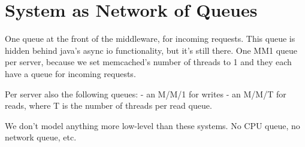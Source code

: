 \documentclass[11pt]{article}
\begin{document}
\section{System as Network of Queues}\label{sec:network-of-queues}



One queue at the front of the middleware, for incoming requests.
This queue is hidden behind java's async io functionality, but it's still there.
One MM1 queue per server, because we set memcached's number of threads to 1 and they each have a queue for incoming requests.

Per server also the following queues:
- an M/M/1 for writes
- an M/M/T for reads, where T is the number of threads per read queue.

We don't model anything more low-level than these systems. No CPU queue, no network queue, etc.

\end{document}
